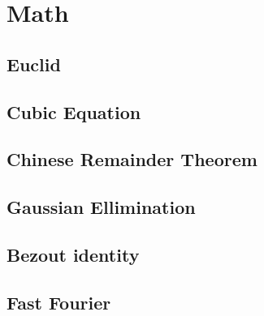\newpage
\section{Math}

\subsection{Euclid}
 

\subsection{Cubic Equation}


\subsection{Chinese Remainder Theorem}
\subsection{Gaussian Ellimination}
\subsection{Bezout identity}
\subsection{Fast Fourier}